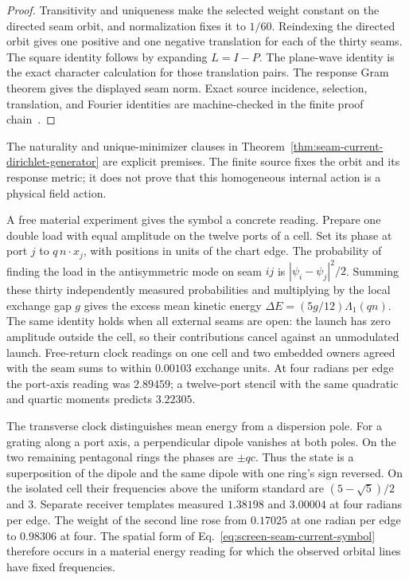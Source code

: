 \documentclass[11pt]{article}
\theoremstyle{remark}
\theoremstyle{plain}
\begin{document}
\begin{proof}
Transitivity and uniqueness make the selected weight constant on the directed
seam orbit, and normalization fixes it to \(1/60\). Reindexing the directed
orbit gives one positive and one negative translation for each of the thirty
seams. The square identity follows by expanding \(L=I-P\). The plane-wave
identity is the exact character calculation for those translation pairs.
The response Gram theorem gives the displayed seam norm. Exact source
incidence, selection, translation, and Fourier identities are machine-checked
in the finite proof chain~\cite{ophrepo}.
\end{proof}

The naturality and unique-minimizer clauses in
Theorem~\ref{thm:seam-current-dirichlet-generator} are explicit premises.
The finite source fixes the orbit and its response metric; it does not prove
that this homogeneous internal action is a physical field action.

A free material experiment gives the symbol a concrete reading. Prepare
one double load with equal amplitude on the twelve ports of a cell. Set
its phase at port $j$ to $q\,n\cdot x_j$, with positions in units of
the chart edge. The probability of finding the load in the antisymmetric
mode on seam $ij$ is $|\psi_i-\psi_j|^2/2$. Summing these thirty
independently measured probabilities and multiplying by the local
exchange gap $g$ gives the excess mean kinetic energy
$\Delta E=(5g/12)\Lambda_1(qn)$. The same identity holds when all
external seams are open: the launch has zero amplitude outside the cell,
so their contributions cancel against an unmodulated launch.
Free-return clock readings on one cell and two embedded owners agreed
with the seam sums to within $0.00103$ exchange units. At four radians
per edge the port-axis reading was $2.89459$; a twelve-port stencil
with the same quadratic and quartic moments predicts $3.22305$.

The transverse clock distinguishes mean energy from a dispersion pole.
For a grating along a port axis, a perpendicular dipole vanishes at
both poles. On the two remaining pentagonal rings the phases are
$\pm qc$. Thus the state is a superposition of the dipole and the same
dipole with one ring's sign reversed. On the isolated cell their
frequencies above the uniform standard are $(5-\sqrt5)/2$ and $3$.
Separate receiver templates measured $1.38198$ and $3.00004$ at
four radians per edge. The weight of the second line rose from
$0.17025$ at one radian per edge to $0.98306$ at four.
The spatial form of Eq.~\eqref{eq:screen-seam-current-symbol}
therefore occurs in a material energy reading for which the observed
orbital lines have fixed frequencies.
\end{document}
